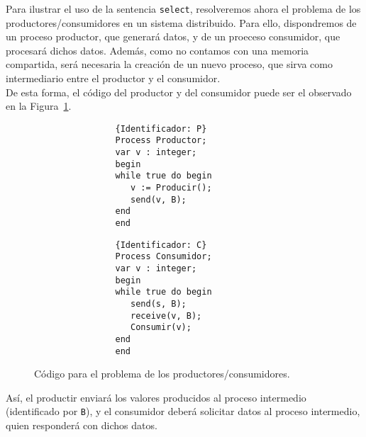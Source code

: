\begin{ejemplo}
    Para ilustrar el uso de la sentencia \verb|select|, resolveremos ahora el problema de los productores/consumidores en un sistema distribuido. Para ello, dispondremos de un proceso productor, que generará datos, y de un proeceso consumidor, que procesará dichos datos. Además, como no contamos con una memoria compartida, será necesaria la creación de un nuevo proceso, que sirva como intermediario entre el productor y el consumidor.\\

    De esta forma, el código del productor y del consumidor puede ser el observado en la Figura~\ref{fig:prod_cons}.
    \begin{figure}[H]
        \centering
        \setlength{\columnsep}{1cm}
        \begin{multicols}{2}
            \begin{verbatim}
                {Identificador: P}
                Process Productor;
                var v : integer;
                begin
                while true do begin
                   v := Producir();
                   send(v, B);
                end
                end
            \end{verbatim}
            \begin{verbatim}
                {Identificador: C}
                Process Consumidor;
                var v : integer;
                begin
                while true do begin
                   send(s, B);
                   receive(v, B);
                   Consumir(v);
                end
                end
            \end{verbatim}
        \end{multicols}
        \caption{Código para el problema de los productores/consumidores.}
        \label{fig:prod_cons}
    \end{figure}
    Así, el productir enviará los valores producidos al proceso intermedio (identificado por \verb|B|), y el consumidor deberá solicitar datos al proceso intermedio, quien responderá con dichos datos.\\


\end{ejemplo}
